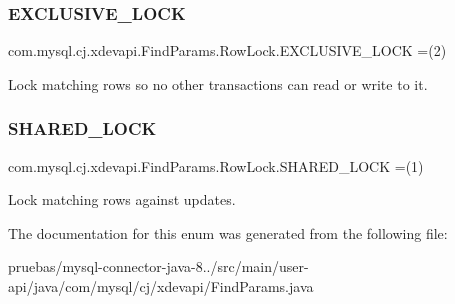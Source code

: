 \subsubsection{\texorpdfstring{E\+X\+C\+L\+U\+S\+I\+V\+E\+\_\+\+L\+O\+CK}{EXCLUSIVE\_LOCK}}
{\footnotesize\ttfamily com.\+mysql.\+cj.\+xdevapi.\+Find\+Params.\+Row\+Lock.\+E\+X\+C\+L\+U\+S\+I\+V\+E\+\_\+\+L\+O\+CK =(2)}

Lock matching rows so no other transactions can read or write to it. \mbox{\label{enumcom_1_1mysql_1_1cj_1_1xdevapi_1_1_find_params_1_1_row_lock_a56bd068879b1d9dda39f4b1a082cb022}} 
\subsubsection{\texorpdfstring{S\+H\+A\+R\+E\+D\+\_\+\+L\+O\+CK}{SHARED\_LOCK}}
{\footnotesize\ttfamily com.\+mysql.\+cj.\+xdevapi.\+Find\+Params.\+Row\+Lock.\+S\+H\+A\+R\+E\+D\+\_\+\+L\+O\+CK =(1)}

Lock matching rows against updates. 

The documentation for this enum was generated from the following file\+:\begin{DoxyCompactItemize}
\item 
pruebas/mysql-\/connector-\/java-\/8../src/main/user-\/api/java/com/mysql/cj/xdevapi/Find\+Params.\+java\end{DoxyCompactItemize}
